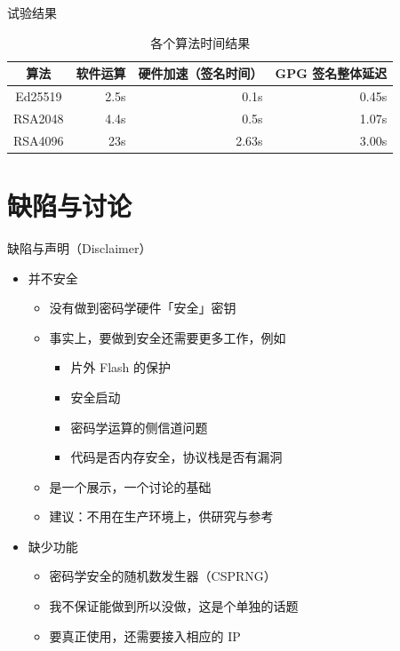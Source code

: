 \documentclass[aspectratio=169]{ctexbeamer}
\begin{document}
\begin{frame}{试验结果}
  \begin{table}
    \centering
    \caption{各个算法时间结果}
    \begin{threeparttable}
    \begin{tabular}{crrr}
      \toprule
      算法 & 软件运算 & 硬件加速（签名时间） & GPG 签名整体延迟\\
      \midrule
      Ed25519 & 2.5s & 0.1s & 0.45s\\
      RSA2048 & 4.4s & 0.5s & 1.07s\\
      RSA4096 & 23s & 2.63s & 3.00s\\
      \bottomrule
    \end{tabular}
    \end{threeparttable}
    \label{tab:sbox-area}
  \end{table}
\end{frame}

\section{缺陷与讨论}
\begin{frame}{缺陷与声明（Disclaimer）}
  \begin{itemize}
    \item 并不安全\begin{itemize}
      \item 没有做到密码学硬件「安全」密钥
      \item 事实上，要做到安全还需要更多工作，例如\begin{itemize}
        \item 片外 Flash 的保护
        \item 安全启动
        \item 密码学运算的侧信道问题
        \item 代码是否内存安全，协议栈是否有漏洞
      \end{itemize}
      \item 是一个展示，一个讨论的基础
      \item 建议：不用在生产环境上，供研究与参考
    \end{itemize}
    \item 缺少功能\begin{itemize}
      \item 密码学安全的随机数发生器（CSPRNG） %
      \item 我不保证能做到所以没做，这是个单独的话题
      \item 要真正使用，还需要接入相应的 IP
    \end{itemize}
  \end{itemize}
\end{frame}
\end{document}

